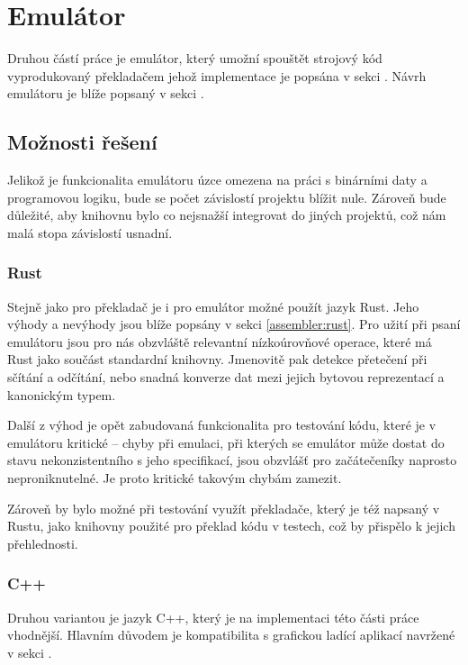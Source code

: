 \chapter{Emulátor}

Druhou částí práce je emulátor, který umožní spouštět strojový kód vyprodukovaný překladačem jehož implementace je popsána v sekci . Návrh emulátoru je blíže popsaný v sekci .

\section{Možnosti řešení}

Jelikož je funkcionalita emulátoru úzce omezena na práci s binárními daty a programovou logiku, bude se počet závislostí projektu blížit nule. Zároveň bude důležité, aby knihovnu bylo co nejsnažší integrovat do jiných projektů, což nám malá stopa závislostí usnadní.

\subsection{Rust}

Stejně jako pro překladač je i pro emulátor možné použít jazyk Rust. Jeho výhody a nevýhody jsou blíže popsány v sekci \ref{assembler:rust}. Pro užití při psaní emulátoru jsou pro nás obzvláště relevantní nízkoúrovňové operace, které má Rust jako součást standardní knihovny. Jmenovitě pak detekce přetečení při sčítání a odčítání\todocite, nebo snadná konverze dat mezi jejich bytovou reprezentací a kanonickým typem\todocite.

Další z výhod je opět zabudovaná funkcionalita pro testování kódu, které je v emulátoru kritické -- chyby při emulaci, při kterých se emulátor může dostat do stavu nekonzistentního s jeho specifikací, jsou obzvlášť pro začátečeníky naprosto neproniknutelné. Je proto kritické takovým chybám zamezit.

Zároveň by bylo možné při testování využít překladače, který je též napsaný v Rustu, jako knihovny použité pro překlad kódu v testech, což by přispělo k jejich přehlednosti.

\subsection{C++}

Druhou variantou je jazyk C++, který je na implementaci této části práce vhodnější. Hlavním důvodem je kompatibilita s grafickou ladící aplikací navržené v sekci .

